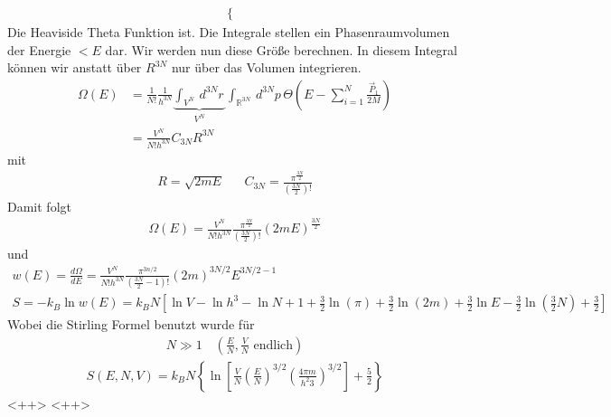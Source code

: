\documentclass[11pt]{article}
\theoremstyle{plain}
\theoremstyle{mytheoremstyle}
\newcommand{\R}{\mathbb{R}}
\renewcommand{\d}[1]{\,d#1\,}
\begin{document}
\begin{description}
\begin{align*}
\begin{cases}
        \end{cases}
      \end{align*}
      Die Heaviside Theta Funktion ist.
      Die Integrale stellen ein Phasenraumvolumen der Energie $< E $ dar.
      Wir werden nun diese Gr\"o\ss{}e berechnen. In diesem Integral k\"onnen
      wir anstatt \"uber $R^{3N}$ nur \"uber das Volumen integrieren.
      \begin{align*}
        \Omega(E) & = \frac{1}{N!} \frac{1}{h^{3N}} \underbrace{\int_{V^N}^{} \d{^{3N} r}}_{V^N}
        \int_{\R^{3N}}^{} \d{^{3N} p} \Theta(E-\sum_{i=1}^{N} \frac{\vec{P}_1}{2M}) \\
        & = \frac{V^N}{ N! h^{3N}} C_{3N} R ^{3N}
      \end{align*}
      mit %
      \begin{align*}
        R = \sqrt{2 m E} && C_{3N} = \frac{\pi^\frac{3N}{2}}{(\frac{3N}{2})!}
      \end{align*}
      Damit folgt
      \begin{align*}
        \Omega(E) = \frac{V^N}{N! h^{3N}} \frac{\pi^\frac{3N}{2}}{(\frac{3N}{2})!}
        (2mE)^\frac{3N}{2}
      \end{align*}
      und 
      \begin{align*}
        w(E) = \frac{d\Omega}{dE} = \frac{V^N}{N! h^{3N}} \frac{\pi^{3 n / 2}}{
        (\frac{3N}{2} - 1)!} (2 m )^{3 N / 2} E ^{ 3 N /2 - 1} \\
        S = - k_B \ln{w(E)} = k_B N \left[ \ln{V} - \ln{h^3} - \ln{N}
        + 1 + \frac{3}{2} \ln{(\pi) } + \frac{3}{2} \ln{(2m)} + \frac{3}{2} \ln{E}
      - \frac{3}{2} \ln{(\frac{3}{2} N)} + \frac{3}{2}\right]
      \end{align*}
      Wobei die Stirling Formel benutzt wurde f\"ur
      \begin{align*}
        N \gg 1 \quad \left(\frac{E}{N}, \frac{V}{N} \text{ endlich}\right)
      \end{align*}
      \begin{align*}
        S(E, N, V) = k_B N \left\{  \ln{ \left[ 
              \frac{V}{N} \left( \frac{E}{N} \right)^{3 / 2} \left( 
        \frac{4 \pi m }{ h^2 3}\right)^{3 / 2} \right] } + \frac{5}{2} \right\}
      \end{align*}
      <++>
      <++>
\end{description}
\end{document}
